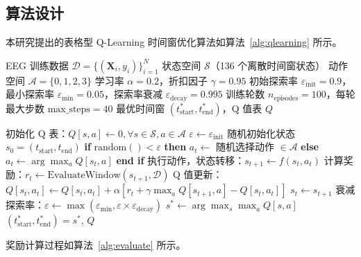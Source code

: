 \subsection{算法设计}
\label{subsec:design}

本研究提出的表格型 Q-Learning 时间窗优化算法如算法~\ref{alg:qlearning} 所示。

\begin{algorithm}[H]
\caption{表格型 Q-Learning 时间窗优化算法}
\label{alg:qlearning}
\begin{algorithmic}[1]
\REQUIRE EEG 训练数据 $\mathcal{D} = \{(\mathbf{X}_i, y_i)\}_{i=1}^N$
\REQUIRE 状态空间 $\mathcal{S}$（136 个离散时间窗状态）
\REQUIRE 动作空间 $\mathcal{A} = \{0, 1, 2, 3\}$
\REQUIRE 学习率 $\alpha = 0.2$，折扣因子 $\gamma = 0.95$
\REQUIRE 初始探索率 $\varepsilon_{\text{init}} = 0.9$，最小探索率 $\varepsilon_{\text{min}} = 0.05$，探索率衰减 $\varepsilon_{\text{decay}} = 0.995$
\REQUIRE 训练轮数 $n_{\text{episodes}} = 100$，每轮最大步数 $\text{max\_steps} = 40$
\ENSURE 最优时间窗 $(t_{\text{start}}^*, t_{\text{end}}^*)$，Q 值表 $Q$

\STATE 初始化 Q 表：$Q[s, a] \leftarrow 0, \forall s \in \mathcal{S}, a \in \mathcal{A}$
\STATE $\varepsilon \leftarrow \varepsilon_{\text{init}}$
    \STATE 随机初始化状态 $s_0 = (t_{\text{start}}, t_{\text{end}})$
        \STATE \textbf{if} $\text{random}() < \varepsilon$ \textbf{then}
            \STATE $a_t \leftarrow$ 随机选择动作 $\in \mathcal{A}$
        \STATE \textbf{else}
            \STATE $a_t \leftarrow \arg\max_a Q[s_t, a]$
        \STATE \textbf{end if}
        \STATE 执行动作，状态转移：$s_{t+1} \leftarrow f(s_t, a_t)$
        \STATE 计算奖励：$r_t \leftarrow \text{EvaluateWindow}(s_{t+1}, \mathcal{D})$
        \STATE Q 值更新：$Q[s_t, a_t] \leftarrow Q[s_t, a_t] + \alpha[r_t + \gamma\max_a Q[s_{t+1}, a] - Q[s_t, a_t]]$
        \STATE $s_t \leftarrow s_{t+1}$
    \ENDFOR
    \STATE 衰减探索率：$\varepsilon \leftarrow \max(\varepsilon_{\text{min}}, \varepsilon \times \varepsilon_{\text{decay}})$
\ENDFOR
\STATE $s^* \leftarrow \arg\max_s \max_a Q[s, a]$
\STATE \RETURN $(t_{\text{start}}^*, t_{\text{end}}^*) = s^*$, $Q$
\end{algorithmic}
\end{algorithm}

奖励计算过程如算法~\ref{alg:evaluate} 所示。

